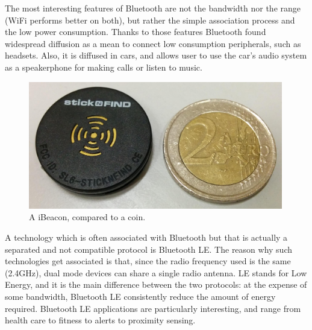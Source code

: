 \documentclass[12pt,a4paper,twoside,openright]{book}
\begin{document}
The most interesting features of Bluetooth are not the bandwidth nor the range (WiFi performs better on both), but rather the simple association process and the low power consumption.
%
Thanks to those features Bluetooth found widespread diffusion as a mean to connect low consumption peripherals, such as headsets.
%
Also, it is diffused in cars, and allows user to use the car's audio system as a speakerphone for making calls or listen to music.

\begin{figure}
	\centering
	\includegraphics[width=0.99\textwidth]{img/ibeacon}
	\caption[iBeacon]{
		A iBeacon, compared to a  coin.
	}
	\label{img:ibeacon}
\end{figure}

A technology which is often associated with Bluetooth but that is actually a separated and not compatible protocol is Bluetooth LE.
%
The reason why such technologies get associated is that, since the radio frequency used is the same (2.4GHz), dual mode devices can share a single radio antenna.
%
LE stands for Low Energy, and it is the main difference between the two protocols: at the expense of some bandwidth, Bluetooth LE consistently reduce the amount of energy required.
%
Bluetooth LE applications are particularly interesting, and range from health care to fitness to alerts to proximity sensing.
\end{document}
